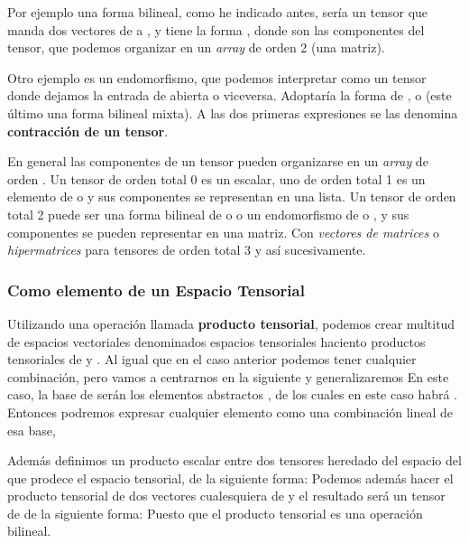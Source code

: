 Por ejemplo una forma bilineal, como he indicado antes, sería un tensor  que manda dos vectores de  a \lrg{$\R$}, y tiene la forma , donde  son las componentes del tensor, que podemos organizar en un \textit{array} de orden 2 (una matriz).

Otro ejemplo es un endomorfismo, que podemos interpretar como un tensor  donde dejamos la entrada de  abierta o viceversa. Adoptaría la forma de ,  o  (este último una forma bilineal mixta).
A las dos primeras expresiones se las denomina \textbf{contracción de un tensor}.

En general las componentes de un tensor  pueden organizarse en un \textit{array} de orden . Un tensor de orden total 0 es un escalar, uno de orden total 1 es un elemento de  o  y sus componentes se representan en una lista. Un tensor de orden total 2 puede ser una forma bilineal de  o  o un endomorfismo de  o , y sus componentes se pueden representar en una matriz. Con \textit{vectores de matrices} o \textit{hipermatrices} para tensores de orden total 3 y así sucesivamente.


\subsubsection{Como elemento de un Espacio Tensorial}

Utilizando una operación llamada \textbf{producto tensorial}, podemos crear multitud de espacios vectoriales denominados espacios tensoriales haciento productos tensoriales de  y .
\lrg{\[\mathcal{T} = V^1 \otimes \dots \otimes V^k \;\;\;\; \; V^i = \{V\mbox{ o }V^*\}\]}
Al igual que en el caso anterior podemos tener cualquier combinación, pero vamos a centrarnos en la siguiente y generalizaremos
\lrg{\[\mathcal{T}=V \otimes V\]}
En este caso, la base de  serán los elementos abstractos , de los cuales en este caso habrá . Entonces podremos expresar cualquier elemento  como una combinación lineal de esa base, 

Además definimos un producto escalar entre dos tensores heredado del espacio del que prodece el espacio tensorial, de la siguiente forma:
Podemos además hacer el producto tensorial de dos vectores cualesquiera de  y el resultado será un tensor de  de la siguiente forma:
Puesto que el producto tensorial es una operación bilineal.

